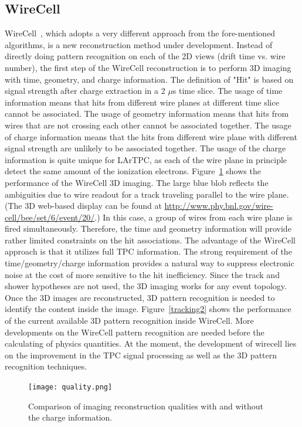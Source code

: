\subsection{WireCell}
WireCell~\cite{wirecell}, which adopts a very different approach from the 
fore-mentioned algorithms, is a new reconstruction method under development.
Instead of directly doing pattern recognition on each of the 2D views (drift 
time vs. wire number), the first step of the WireCell reconstruction is to 
perform 3D imaging with time, geometry, and charge information. The definition
of "Hit" is based on signal strength after charge extraction in a 2 $\mu$s time slice. The usage of 
time information means that hits from different wire planes at different time 
slice cannot be associated. The usage of geometry information means that hits
from wires that are not crossing each other cannot be associated together. 
The usage of charge information means that the hits from different wire plane
with different signal strength are unlikely to be associated together. The 
usage of the charge information is quite unique for LArTPC, as each of the 
wire plane in principle detect the same amount of the ionization electrons. 
Figure~\ref{quality} shows the performance of the WireCell 3D imaging. 
The large blue blob reflects the ambiguities due to wire readout for a track
traveling parallel to the wire plane. (The 3D web-based 
display can be found at 
\url{http://www.phy.bnl.gov/wire-cell/bee/set/6/event/20/}.) In this case, a group of wires from each 
wire plane is fired simultaneously. Therefore, the time and geometry 
information will provide rather limited constraints on the hit associations. 
The advantage of the WireCell approach is that it utilizes full TPC 
information. The strong requirement of the time/geometry/charge information
provides a natural way to suppress electronic noise at the cost of more
sensitive to the hit inefficiency. Since the track and shower hypotheses
are not used, the 3D imaging works for any event topology. Once the 3D
images are reconstructed, 3D pattern recognition is needed to identify 
the content inside the image. Figure~\ref{tracking2} shows the 
performance of the current available 3D pattern recognition inside
WireCell. More developments on the WireCell pattern recognition 
are needed before the calculating of physics quantities. At the moment, the 
development of wirecell lies on the improvement in the TPC signal 
processing as well as the 3D pattern recognition techniques.


\begin{figure}[!ht]
\texttt{[image: quality.png]}
\caption[Comparison of imaging recon
qualities with and without charge information]{Comparison of imaging reconstruction 
qualities with and without the charge information. }
\label{quality}
\end{figure}


